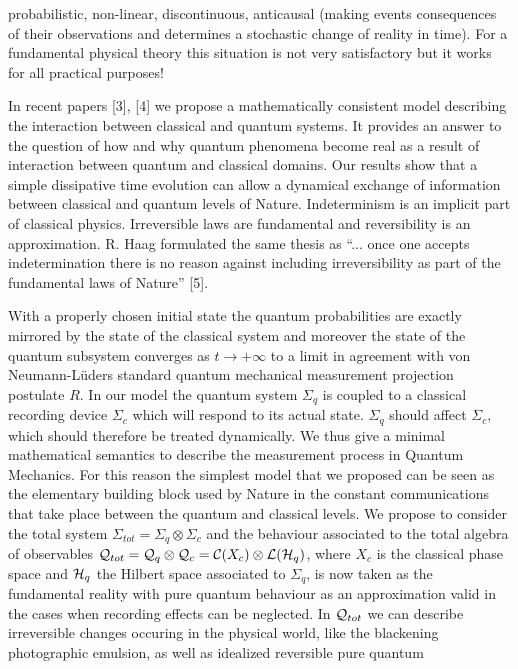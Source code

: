 probabilistic, non-linear, discontinuous, anticausal (making events
consequences of their observations and determines a stochastic change
of reality in time).
For a fundamental physical
theory this situation is not very satisfactory but it works for all
practical purposes!\par
In recent papers [3], [4] we propose a mathematically consistent
model describing the interaction between classical and quantum
systems. It provides an answer to the question of how and why quantum
phenomena become real as a result of interaction between quantum and
classical domains. Our results show that a simple dissipative time
evolution can allow a dynamical exchange of information between
classical and quantum levels of Nature. Indeterminism is an implicit
part of classical physics. Irreversible laws are fundamental and
reversibility is an approximation. R. Haag formulated the same thesis
as ``... once one accepts indetermination there is no reason against
including irreversibility as part of the fundamental laws of Nature''
[5].\par
With a properly chosen initial state the quantum probabilities are
exactly mirrored by the state of the classical system and moreover
the state of the quantum subsystem converges as $t \to + \infty$
to a limit in agreement with von Neumann-L\"uders standard quantum
mechanical measurement projection postulate $R$. In our model the
quantum system $\Sigma_q$ is coupled to a classical recording
device $\Sigma_c$ which will respond to its actual state. $\Sigma_q$
should affect $\Sigma_c$, which should therefore be treated dynamically.
We thus give a minimal mathematical semantics to describe the
measurement process in Quantum Mechanics. For this reason the simplest
model that we proposed can be seen as the elementary building block
used by Nature in the constant communications that take place between
the quantum and classical levels. We propose to consider the total
system $\Sigma_{tot} = \Sigma_q \otimes \Sigma_c$ and the behaviour
associated to the total algebra of observables ${\cal Q}_{tot} =
{\cal Q}_q \otimes {\cal Q}_c = {\cal C} (X_c) \otimes {\cal L}
({\cal H}_q)$, where $X_c$ is the classical phase space and
${\cal H}_q$ the Hilbert space associated to $\Sigma_q$, is now
taken as the fundamental reality with pure quantum behaviour as an
approximation valid in the cases when recording effects can be
neglected. In ${\cal Q}_{tot}$ we can describe irreversible changes
occuring in the physical world, like the blackening photographic
emulsion, as well as idealized reversible pure quantum
